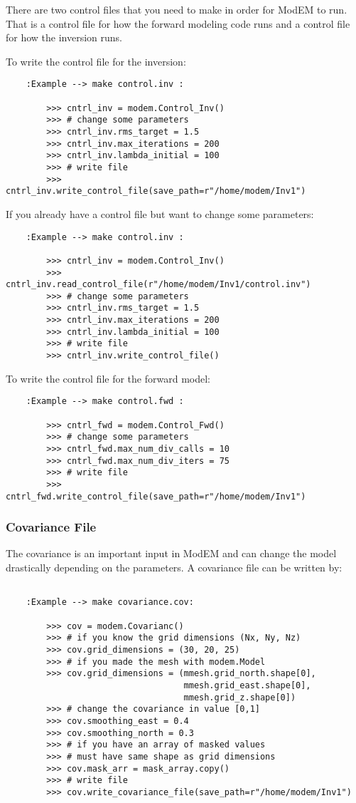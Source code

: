 There are two control files that you need to make in order for ModEM to run.  That is a control file for how the forward modeling code runs and a control file for how the inversion runs.

To write the control file for the inversion:

\begin{verbatim}
	:Example --> make control.inv : 
	
		>>> cntrl_inv = modem.Control_Inv()
		>>> # change some parameters
		>>> cntrl_inv.rms_target = 1.5
		>>> cntrl_inv.max_iterations = 200
		>>> cntrl_inv.lambda_initial = 100
		>>> # write file
		>>> cntrl_inv.write_control_file(save_path=r"/home/modem/Inv1")
\end{verbatim}

If you already have a control file but want to change some parameters:

\begin{verbatim}
	:Example --> make control.inv :
	
		>>> cntrl_inv = modem.Control_Inv()
		>>> cntrl_inv.read_control_file(r"/home/modem/Inv1/control.inv")
		>>> # change some parameters
		>>> cntrl_inv.rms_target = 1.5
		>>> cntrl_inv.max_iterations = 200
		>>> cntrl_inv.lambda_initial = 100
		>>> # write file
		>>> cntrl_inv.write_control_file()
\end{verbatim}

To write the control file for the forward model:

\begin{verbatim}
	:Example --> make control.fwd :
	
		>>> cntrl_fwd = modem.Control_Fwd()
		>>> # change some parameters
		>>> cntrl_fwd.max_num_div_calls = 10
		>>> cntrl_fwd.max_num_div_iters = 75
		>>> # write file
		>>> cntrl_fwd.write_control_file(save_path=r"/home/modem/Inv1")
\end{verbatim}

\subsubsection{Covariance File}

The covariance is an important input in ModEM and can change the model drastically depending on the parameters.  A covariance file can be written by:

\begin{verbatim}

	:Example --> make covariance.cov: 
	
		>>> cov = modem.Covarianc()
		>>> # if you know the grid dimensions (Nx, Ny, Nz)
		>>> cov.grid_dimensions = (30, 20, 25)
		>>> # if you made the mesh with modem.Model
		>>> cov.grid_dimensions = (mmesh.grid_north.shape[0], 
								   mmesh.grid_east.shape[0],
								   mmesh.grid_z.shape[0])
		>>> # change the covariance in value [0,1]
		>>> cov.smoothing_east = 0.4
		>>> cov.smoothing_north = 0.3
		>>> # if you have an array of masked values
		>>> # must have same shape as grid dimensions
		>>> cov.mask_arr = mask_array.copy()
		>>> # write file
		>>> cov.write_covariance_file(save_path=r"/home/modem/Inv1")
	
\end{verbatim}

